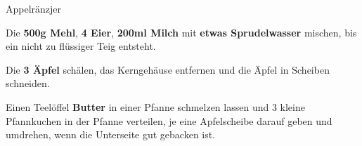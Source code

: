 \begin{recipe}[]{Appelränzjer} %
	\personcount{} %

\step
Die \textbf{500g Mehl}, \textbf{4 Eier}, \textbf{200ml Milch} mit \textbf{etwas Sprudelwasser}  mischen, bis ein nicht zu flüssiger Teig entsteht.

\step
Die \textbf{3 Äpfel} schälen, das Kerngehäuse entfernen und die Äpfel in Scheiben schneiden.

\step
Einen Teelöffel \textbf{Butter} in einer Pfanne schmelzen lassen und 3 kleine Pfannkuchen in der Pfanne verteilen, je eine Apfelscheibe darauf geben und umdrehen, wenn die Unterseite gut gebacken ist.


\end{recipe}